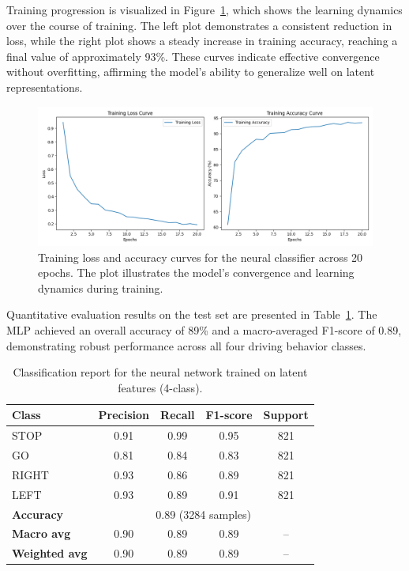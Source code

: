 Training progression is visualized in Figure~\ref{fig:loss_accuracy_plot}, which shows the learning dynamics over the course of training. The left plot demonstrates a consistent reduction in loss, while the right plot shows a steady increase in training accuracy, reaching a final value of approximately 93\%. These curves indicate effective convergence without overfitting, affirming the model's ability to generalize well on latent representations.

\begin{figure}[h]
    \centering
    \includegraphics[width=\textwidth]{img/classifier/training_loss_accuracy_4_classes.png}
    \caption[Training performance of 4-class neural classifier]{%
Training loss and accuracy curves for the neural classifier across 20 epochs. The plot illustrates the model's convergence and learning dynamics during training.}
    \label{fig:loss_accuracy_plot}
\end{figure}

Quantitative evaluation results on the test set are presented in Table~\ref{tab:classification_report}. The MLP achieved an overall accuracy of 89\% and a macro-averaged F1-score of 0.89, demonstrating robust performance across all four driving behavior classes.

\begin{table}[h]
    \centering
    \begin{tabular}{lcccc}
        \toprule
        \textbf{Class} & \textbf{Precision} & \textbf{Recall} & \textbf{F1-score} & \textbf{Support} \\
        \midrule
        STOP & 0.91 & 0.99 & 0.95 & 821 \\
        GO & 0.81 & 0.84 & 0.83 & 821 \\
        RIGHT & 0.93 & 0.86 & 0.89 & 821 \\
        LEFT & 0.93 & 0.89 & 0.91 & 821 \\
        \midrule
        \textbf{Accuracy} & \multicolumn{4}{c}{0.89 (3284 samples)} \\
        \textbf{Macro avg} & 0.90 & 0.89 & 0.89 & -- \\
        \textbf{Weighted avg} & 0.90 & 0.89 & 0.89 & -- \\
        \bottomrule
    \end{tabular}
    \caption{Classification report for the neural network trained on latent features (4-class).}
    \label{tab:classification_report}
\end{table}

